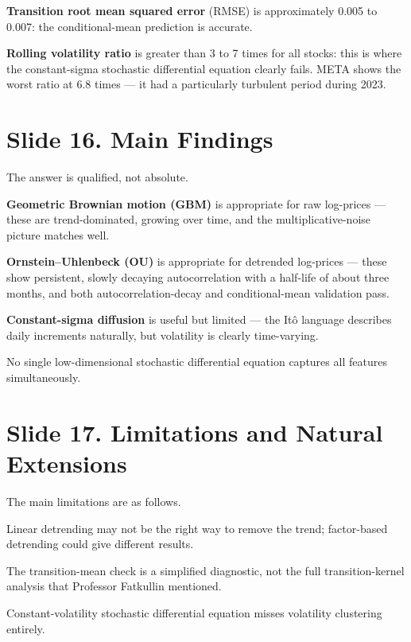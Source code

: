 \documentclass[12pt,a4paper]{article}
\begin{document}
\textbf{Transition root mean squared error} (RMSE)
is approximately 0.005 to 0.007:
the conditional-mean prediction is accurate.

\textbf{Rolling volatility ratio} is greater than 3 to 7 times for all stocks:
this is where the constant-sigma stochastic differential equation clearly fails.
META shows the worst ratio at 6.8 times ---
it had a particularly turbulent period during 2023.

\section{Slide 16. Main Findings}

The answer is qualified, not absolute.

\textbf{Geometric Brownian motion (GBM)} is appropriate for raw log-prices ---
these are trend-dominated, growing over time,
and the multiplicative-noise picture matches well.

\textbf{Ornstein--Uhlenbeck (OU)} is appropriate for detrended log-prices ---
these show persistent, slowly decaying autocorrelation
with a half-life of about three months,
and both autocorrelation-decay and conditional-mean validation pass.

\textbf{Constant-sigma diffusion} is useful but limited ---
the Itô language describes daily increments naturally,
but volatility is clearly time-varying.

No single low-dimensional stochastic differential equation
captures all features simultaneously.

\section{Slide 17. Limitations and Natural Extensions}

The main limitations are as follows.

Linear detrending may not be the right way to remove the trend;
factor-based detrending could give different results.

The transition-mean check is a simplified diagnostic,
not the full transition-kernel analysis that Professor Fatkullin mentioned.

Constant-volatility stochastic differential equation
misses volatility clustering entirely.
\end{document}

